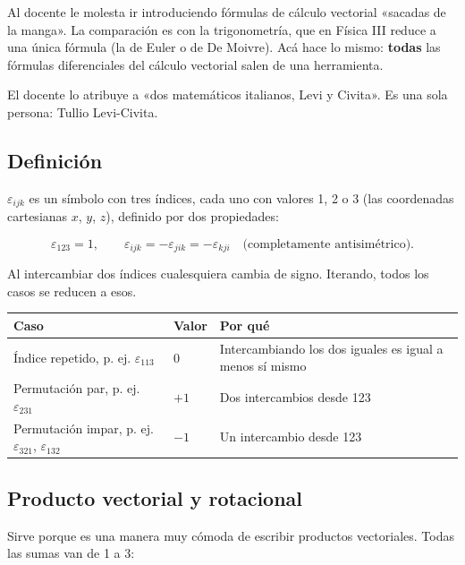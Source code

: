 \documentclass[12pt,a4paper]{article}
\begin{document}
Al docente le molesta ir introduciendo fórmulas de cálculo vectorial «sacadas
de la manga». La comparación es con la trigonometría, que en Física III reduce a
una única fórmula (la de Euler o de De Moivre). Acá hace lo mismo: \textbf{todas} las
fórmulas diferenciales del cálculo vectorial salen de una herramienta.

\begin{notebox}
El docente lo atribuye a «dos matemáticos italianos, Levi y Civita». Es una
sola persona: Tullio Levi-Civita.
\end{notebox}

\subsection{Definición}

$\varepsilon_{ijk}$ es un símbolo con tres índices, cada uno con valores 1, 2
o 3 (las coordenadas cartesianas $x$, $y$, $z$), definido por dos propiedades:

\[
\varepsilon_{123} = 1,
\qquad
\varepsilon_{ijk} = -\varepsilon_{jik} = -\varepsilon_{kji}
\quad\text{(completamente antisimétrico).}
\]

Al intercambiar dos índices cualesquiera cambia de signo. Iterando, todos los
casos se reducen a esos.

\begin{center}
\renewcommand{\arraystretch}{1.35}
\small
\begin{tabularx}{\textwidth}{>{\raggedright\arraybackslash}X>{\raggedright\arraybackslash}X>{\raggedright\arraybackslash}X}
\toprule
\textbf{Caso} & \textbf{Valor} & \textbf{Por qué} \\
\midrule
Índice repetido, p. ej. $\varepsilon_{113}$ & $0$ & Intercambiando los dos iguales es igual a menos sí mismo \\
Permutación par, p. ej. $\varepsilon_{231}$ & $+1$ & Dos intercambios desde 123 \\
Permutación impar, p. ej. $\varepsilon_{321}$, $\varepsilon_{132}$ & $-1$ & Un intercambio desde 123 \\
\bottomrule
\end{tabularx}
\end{center}

\subsection{Producto vectorial y rotacional}

Sirve porque es una manera muy cómoda de escribir productos vectoriales. Todas
las sumas van de 1 a 3:
\end{document}
